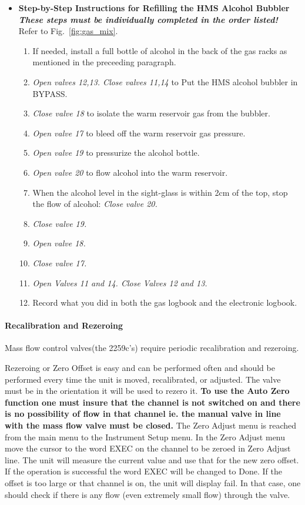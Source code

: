\begin{itemize}
\item{ \bf{Step-by-Step Instructions for Refilling the HMS Alcohol Bubbler}\\
\em{These steps must be individually completed in the order listed!}}\\
Refer to Fig.~\ref{fig:gas_mix}. 
\begin{enumerate}
\item{If needed, install a full bottle of alcohol in the back of the gas racks as mentioned in the preceeding paragraph.}
\item{ {\em Open valves 12,13. Close valves 11,14} to Put the HMS alcohol bubbler in BYPASS.}
\item{{\em Close valve 18} to isolate the warm reservoir gas from the bubbler.}
\item{{\em Open valve 17} to bleed off the warm reservoir gas pressure.}
\item{{\em Open valve 19} to pressurize the alcohol bottle.}
\item{{\em Open valve 20} to flow alcohol into the warm reservoir.}
\item{When the alcohol level in the sight-glass is within 2cm of the top, stop
the flow of alcohol: {\em Close valve 20.}}
\item{{\em Close valve 19.}}
\item{{\em Open valve 18.}}
\item{{\em Close valve 17.}}
\item{{\em Open Valves 11 and 14. Close Valves 12 and 13.}}
\item{Record what you did in both the gas logbook and the electronic logbook.} 
\end{enumerate}
\end{itemize}

\paragraph{Recalibration and Rezeroing}

Mass flow control valves(the 2259c's) require periodic recalibration
and rezeroing.


Rezeroing or Zero Offset is easy and can be performed often and should be
performed every time the unit is moved, recalibrated, or adjusted.  The
valve must be in the orientation it will be used to rezero it.
{\bf To use the
Auto Zero function one must insure that the channel is not switched on and
there is no possibility of flow in that channel ie. the manual valve in
line with the mass flow valve must be closed.}
The Zero Adjust menu is
reached from the main menu to the Instrument Setup menu.  In the Zero
Adjust menu move the cursor to the word EXEC on the channel to be zeroed in
Zero Adjust line.  The unit will measure the current value and use that for
the new zero offset.  If the operation is successful the word EXEC will be
changed to Done.  If the offset is too large or that channel is on, the
unit will display fail.  In that case, one should check if there is any
flow (even extremely small flow) through the valve.


